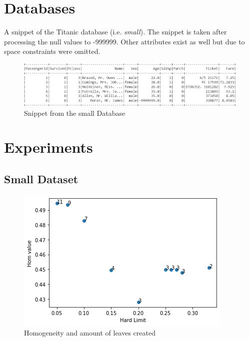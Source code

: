 \documentclass[sigconf]{acmart}
\begin{document}



\appendix

\begin{appendices}


\section{Databases}
A snippet of the Titanic database (i.e. \textit{small}). The snippet is taken after processing the null values to -999999. Other attributes exist as well but due to space constraints were omitted.
\begin{figure}[h!]
    \centering
    \includegraphics[scale=0.4]{images/SmallDatabaseSample.png}
    \caption{Snippet from the small Database}
    \label{fig:SmallDatabaseSnippet}
\end{figure}

\section{Experiments}
\subsection{Small Dataset}
\begin{figure}[h!]
    \centering
    \includegraphics[scale=0.52]{images/HomVsAmountOfLeavesForSmall.png}
    \caption{Homogeneity and amount of leaves created}
    \label{fig:HomLeavesSmall}
\end{figure}


\end{appendices}
\end{document}
